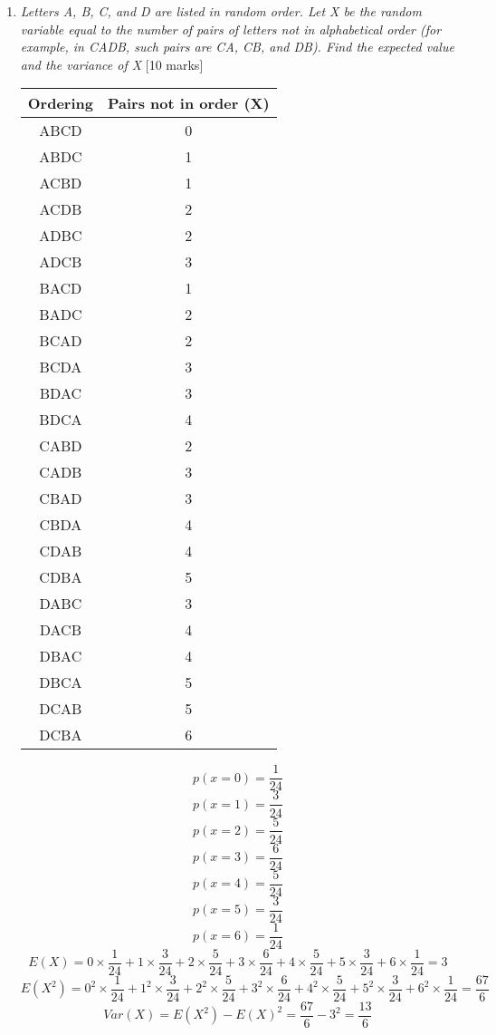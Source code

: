 \documentclass{article}[18pt]
\begin{document}
\begin{enumerate}
	\newpage
	\item\textit{ Letters A, B, C, and D are listed in random order. Let X be the random variable
	equal to the number of pairs of letters not in alphabetical order (for example, in
	CADB, such pairs are CA, CB, and DB). Find the expected value and the variance
	of X} \hfill[10 marks]\\
	\begin{tabular}{|c|c|}
		\hline 
		Ordering & Pairs not in order (X) \\ 
		\hline 
		ABCD & 0 \\ 
		\hline 
		ABDC & 1 \\ 
		\hline 
		ACBD & 1 \\ 
		\hline 
		ACDB & 2 \\ 
		\hline 
		ADBC & 2 \\ 
		\hline 
		ADCB & 3 \\ 
		\hline 
		BACD & 1 \\ 
		\hline 
		BADC & 2 \\ 
		\hline 
		BCAD & 2 \\ 
		\hline 
		BCDA & 3 \\ 
		\hline 
		BDAC & 3 \\ 
		\hline 
		BDCA & 4 \\ 
		\hline 
		CABD & 2 \\ 
		\hline 
		CADB & 3 \\ 
		\hline 
		CBAD & 3 \\ 
		\hline 
		CBDA & 4 \\ 
		\hline 
		CDAB & 4 \\ 
		\hline 
		CDBA & 5 \\ 
		\hline 
		DABC & 3 \\ 
		\hline 
		DACB & 4 \\ 
		\hline 
		DBAC & 4 \\ 
		\hline 
		DBCA & 5 \\ 
		\hline 
		DCAB & 5 \\ 
		\hline 
		DCBA & 6 \\ 
		\hline 
	\end{tabular} 
$$p(x=0)=\dfrac{1}{24}$$
$$p(x=1)=\dfrac{3}{24}$$
$$p(x=2)=\dfrac{5}{24}$$
$$p(x=3)=\dfrac{6}{24}$$
$$p(x=4)=\dfrac{5}{24}$$
$$p(x=5)=\dfrac{3}{24}$$
$$p(x=6)=\dfrac{1}{24}$$
$$E(X)=0\times\dfrac{1}{24}+
1\times\dfrac{3}{24}+
2\times\dfrac{5}{24}+
3\times\dfrac{6}{24}+
4\times\dfrac{5}{24}+
5\times\dfrac{3}{24}+
6\times\dfrac{1}{24}=3$$
$$E(X^2)=0^2\times\dfrac{1}{24}+
1^2\times\dfrac{3}{24}+
2^2\times\dfrac{5}{24}+
3^2\times\dfrac{6}{24}+
4^2\times\dfrac{5}{24}+
5^2\times\dfrac{3}{24}+
6^2\times\dfrac{1}{24}=\dfrac{67}{6}$$
$$Var(X)=E(X^2)-E(X)^2=\dfrac{67}{6}-3^2=\dfrac{13}{6}$$
\newpage
	

\end{enumerate}
\end{document}
